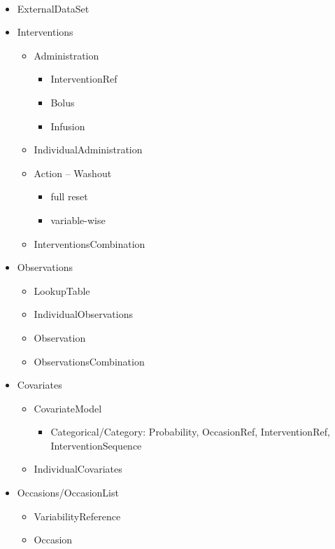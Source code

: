\begin{minipage}{0.6\textwidth}
\small
\centering 
{}\\
{\color{red} \scshape{}}
\begin{flushright}
\begin{itemize}
\item 
ExternalDataSet
\item 
Interventions
\begin{itemize}
\item 
Administration
\begin{itemize}
\item 
InterventionRef
\item
Bolus
\item
Infusion
\end{itemize}
\item 
IndividualAdministration
\item 
Action -- Washout
\begin{itemize}
\item 
full reset
\item 
variable-wise
\end{itemize}
\item
InterventionsCombination
\end{itemize}
\item 
Observations
\begin{itemize}
\item 
LookupTable 
\item 
IndividualObservations
\item 
Observation
\item 
ObservationsCombination
\end{itemize}
\item 
Covariates
\begin{itemize}
\item 
CovariateModel
\begin{itemize}
\item
Categorical/Category: Probability, OccasionRef, InterventionRef, InterventionSequence
\end{itemize}
\item 
IndividualCovariates
\end{itemize}
\item 
Occasions/OccasionList
\begin{itemize}
\item 
VariabilityReference
\item 
Occasion
\end{itemize}

\end{itemize}
\end{flushright}
\end{minipage}
